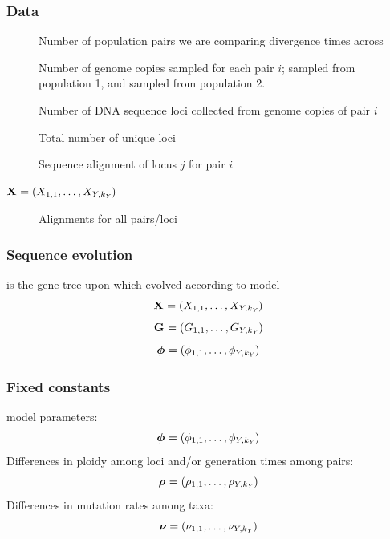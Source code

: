 \begin{frame}
    \frametitle{Data}
    \begin{description}
        \item[\npairs{}] Number of population pairs we are comparing
            divergence times across
        \item[] Number of genome copies sampled for each
                pair $i$;  sampled from population 1, and
                 sampled from population 2.
        \item[] Number of DNA sequence loci collected from genome
            copies of pair $i$
        \item[\nlociTotal] Total number of unique loci
        \item[] Sequence alignment of locus $j$ for pair $i$
        \item[$\alignmentVector = (\alignment{1}{1}, \ldots,
            \alignment{\npairs{}}{\nloci{\npairs{}}})$]
            Alignments for all pairs/loci
    \end{description}
\end{frame}

\begin{frame}
    \frametitle{Sequence evolution}
     is the gene tree upon which 
            evolved according to \hky model 
    \[
        \alignmentVector = (\alignment{1}{1}, \ldots,
            \alignment{\npairs{}}{\nloci{\npairs{}}})
    \]
    \[
        \geneTreeVector = (\geneTree{1}{1}, \ldots,
        \geneTree{\npairs{}}{\nloci{\npairs{}}})
    \]
    \[
        \hkyModelVector = (\hkyModel{1}{1}, \ldots,
        \hkyModel{\npairs{}}{\nloci{\npairs{}}})
    \]
\end{frame}

\begin{frame}
    \frametitle{Fixed constants}
    \hky model parameters:
    \[
        \hkyModelVector = (\hkyModel{1}{1}, \ldots,
        \hkyModel{\npairs{}}{\nloci{\npairs{}}})
    \]
    Differences in ploidy among loci and/or generation times among
    pairs:
    \[
        \ploidyScalarVector = (\ploidyScalar{1}{1}, \ldots,
        \ploidyScalar{\npairs{}}{\nloci{\npairs{}}})
    \]
    Differences in mutation rates among taxa:
    \[
        \mutationRateScalarConstantVector = (\mutationRateScalarConstant{1}{1},
        \ldots, \mutationRateScalarConstant{\npairs{}}{\nloci{\npairs{}}})
    \]
\end{frame}

